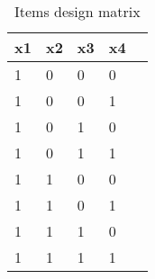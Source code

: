 \begin{table}[htbp]
\caption{\label{tab:X} Items design matrix}\centering\medskip
\begin{tabular}{lllll} \hline \hline
 \multicolumn{1}{c}{ x1 }  & x2  & x3  & x4  \\  \hline 
1 & 0 & 0 & 0 \\  
1 & 0 & 0 & 1 \\  
1 & 0 & 1 & 0 \\  
1 & 0 & 1 & 1 \\  
1 & 1 & 0 & 0 \\  
1 & 1 & 0 & 1 \\  
1 & 1 & 1 & 0 \\  
1 & 1 & 1 & 1 \\  
\hline \hline \end{tabular}
\end{table}
